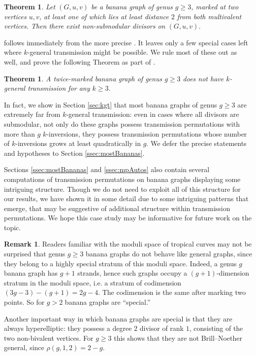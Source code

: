 \documentclass[11pt]{article}
\newtheorem{theorem}[theo]{Theorem}
\theoremstyle{definition}
\newtheorem{rema}[theo]{Remark}
\numberwithin{equation}{section}
\begin{document}
\begin{theorem} \label{thm:bananaSimple}
Let $(G,u,v)$ be a banana graph of genus $g \geq 3$, marked at two vertices $u,v$, at least one of which lies at least distance $2$ from both multivalent vertices. Then there exist non-submodular divisors on $(G,u,v)$.
\end{theorem}

 follows immediately from the more precise . It leaves only a few special cases left where $k$-general transmission might be possible. We rule most of these out as well, and prove the following Theorem as part of .

\begin{theorem}\label{thm:bananas}
    A twice-marked banana graph of genus $g \geq 3$ does not have $k$-general transmission for any $k\geq 3$.
\end{theorem}

In fact, we show in Section \ref{sec:kgt} that most banana graphs of genus $g \geq 3$ are extremely far from $k$-general transmission: even in cases where all divisors are submodular, not only do these graphs possess transmission permutations with more than $g$ $k$-inversions, they possess transmission permutations whose number of $k$-inversions grows at least quadratically in $g$. We defer the precise statements and hypotheses to Section \ref{ssec:mostBananas}.

Sections \ref{ssec:mostBananas} and \ref{ssec:mpAutos} also contain several computations of transmission permutations on banana graphs displaying some intriguing structure. Though we do not need to exploit all of this structure for our results, we have shown it in some detail due to some intriguing patterns that emerge, that may be suggestive of additional structure within transmission permutations. We hope this case study may be informative for future work on the topic.

\begin{rema}
Readers familiar with the moduli space of tropical curves may not be surprised that genus $g \geq 3$ banana graphs do not behave like general graphs, since they belong to a highly special stratum of this moduli space. Indeed, a genus $g$ banana graph has $g+1$ strands, hence such graphs occupy a $(g+1)$-dimension stratum in the moduli space, i.e. a stratum of codimension $(3g-3) -(g+1) = 2g-4$. The codimension is the same after marking two points. So for $g > 2$ banana graphs are ``special.''

Another important way in which banana graphs are special is that they are always hyperelliptic: they possess a degree $2$ divisor of rank $1$, consisting of the two non-bivalent vertices. For $g \geq 3$ this shows that they are not Brill--Noether general, since $\rho(g,1,2) = 2-g$.
\end{rema}
\end{document}
